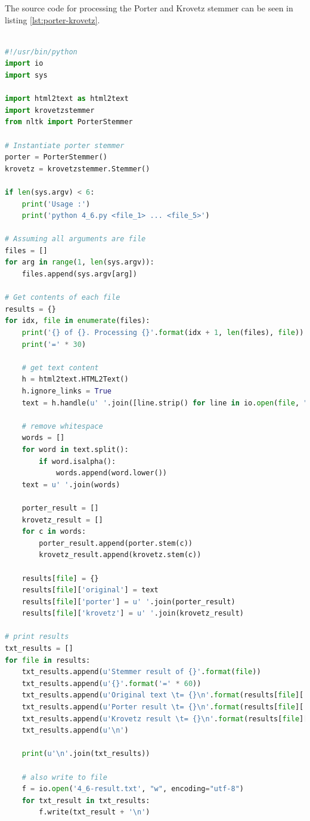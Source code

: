 \documentclass[letterpaper,11pt]{article}
\begin{document}
The source code for processing the Porter and Krovetz stemmer can be seen in listing \ref{lst:porter-krovetz}.

\begin{lstlisting}[language=python, caption={Source code for stemming document using Porter Stemmer and Krovetz Stemmer}, label={lst:porter-krovetz}]

#!/usr/bin/python
import io
import sys

import html2text as html2text
import krovetzstemmer
from nltk import PorterStemmer

# Instantiate porter stemmer
porter = PorterStemmer()
krovetz = krovetzstemmer.Stemmer()

if len(sys.argv) < 6:
    print('Usage :')
    print('python 4_6.py <file_1> ... <file_5>')

# Assuming all arguments are file
files = []
for arg in range(1, len(sys.argv)):
    files.append(sys.argv[arg])

# Get contents of each file
results = {}
for idx, file in enumerate(files):
    print('{} of {}. Processing {}'.format(idx + 1, len(files), file))
    print('=' * 30)

    # get text content
    h = html2text.HTML2Text()
    h.ignore_links = True
    text = h.handle(u' '.join([line.strip() for line in io.open(file, "r", encoding="utf-8").readlines()]))

    # remove whitespace
    words = []
    for word in text.split():
        if word.isalpha():
            words.append(word.lower())
    text = u' '.join(words)

    porter_result = []
    krovetz_result = []
    for c in words:
        porter_result.append(porter.stem(c))
        krovetz_result.append(krovetz.stem(c))

    results[file] = {}
    results[file]['original'] = text
    results[file]['porter'] = u' '.join(porter_result)
    results[file]['krovetz'] = u' '.join(krovetz_result)

# print results
txt_results = []
for file in results:
    txt_results.append(u'Stemmer result of {}'.format(file))
    txt_results.append(u'{}'.format('=' * 60))
    txt_results.append(u'Original text \t= {}\n'.format(results[file]['original']))
    txt_results.append(u'Porter result \t= {}\n'.format(results[file]['porter']))
    txt_results.append(u'Krovetz result \t= {}\n'.format(results[file]['krovetz']))
    txt_results.append(u'\n')

    print(u'\n'.join(txt_results))

    # also write to file
    f = io.open('4_6-result.txt', "w", encoding="utf-8")
    for txt_result in txt_results:
        f.write(txt_result + '\n')
\end{lstlisting}
\end{document}
